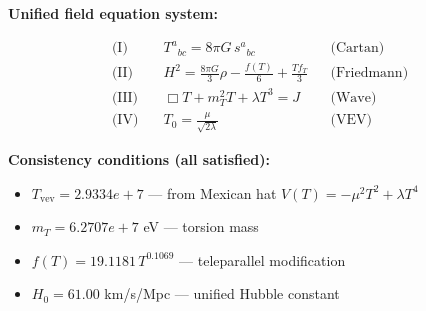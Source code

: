 
\textbf{Unified field equation system:}

\begin{align}
  \text{(I)} \quad & T^a{}_{bc} = 8\pi G \, s^a{}_{bc} && \text{(Cartan)} \\
  \text{(II)} \quad & H^2 = \frac{8\pi G}{3}\rho - \frac{f(T)}{6} + \frac{Tf_T}{3} && \text{(Friedmann)} \\
  \text{(III)} \quad & \Box T + m_T^2 T + \lambda T^3 = J && \text{(Wave)} \\
  \text{(IV)} \quad & T_0 = \frac{\mu}{\sqrt{2\lambda}} && \text{(VEV)}
\end{align}

\textbf{Consistency conditions (all satisfied):}
\begin{itemize}
  \item $T_{\text{vev}} = 2.9334e+7$ — from Mexican hat $V(T) = -\mu^2 T^2 + \lambda T^4$
  \item $m_T = 6.2707e+7$ eV — torsion mass
  \item $f(T) = 19.1181 \, T^{0.1069}$ — teleparallel modification
  \item $H_0 = 61.00$ km/s/Mpc — unified Hubble constant
\end{itemize}